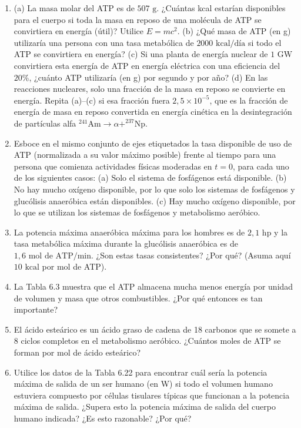 \documentclass[12pt]{book}
\begin{document}
\begin{enumerate}
\item[6.39] (a) La masa molar del ATP es de $507\text{ g}$. ¿Cuántas kcal estarían disponibles para el cuerpo si toda la masa en reposo de una molécula de ATP se convirtiera en energía (útil)? Utilice $E = mc^2$. (b) ¿Qué masa de ATP (en g) utilizaría una persona con una tasa metabólica de $2000\text{ kcal/día}$ si todo el ATP se convirtiera en energía? (c) Si una planta de energía nuclear de $1\text{ GW}$ convirtiera esta energía de ATP en energía eléctrica con una eficiencia del $20\%$, ¿cuánto ATP utilizaría (en g) por segundo y por año? (d) En las reacciones nucleares, solo una fracción de la masa en reposo se convierte en energía. Repita (a)--(c) si esa fracción fuera $2{,}5 \times 10^{-5}$, que es la fracción de energía de masa en reposo convertida en energía cinética en la desintegración de partículas alfa $^{241}\text{Am} \rightarrow \alpha + ^{237}\text{Np}$.

\item[6.40] Esboce en el mismo conjunto de ejes etiquetados la tasa disponible de uso de ATP (normalizada a su valor máximo posible) frente al tiempo para una persona que comienza actividades físicas moderadas en $t = 0$, para cada uno de los siguientes casos: (a) Solo el sistema de fosfágenos está disponible. (b) No hay mucho oxígeno disponible, por lo que solo los sistemas de fosfágenos y glucólisis anaeróbica están disponibles. (c) Hay mucho oxígeno disponible, por lo que se utilizan los sistemas de fosfágenos y metabolismo aeróbico.

\item[6.41] La potencia máxima anaeróbica máxima para los hombres es de $2{,}1\text{ hp}$ y la tasa metabólica máxima durante la glucólisis anaeróbica es de $1{,}6\text{ mol de ATP/min}$. ¿Son estas tasas consistentes? ¿Por qué? (Asuma aquí $10\text{ kcal}$ por mol de ATP).

\item[6.42] La Tabla 6.3 muestra que el ATP almacena mucha menos energía por unidad de volumen y masa que otros combustibles. ¿Por qué entonces es tan importante?

\item[6.43] El ácido esteárico es un ácido graso de cadena de 18 carbonos que se somete a 8 ciclos completos en el metabolismo aeróbico. ¿Cuántos moles de ATP se forman por mol de ácido esteárico?

\item[6.44] Utilice los datos de la Tabla 6.22 para encontrar cuál sería la potencia máxima de salida de un ser humano (en W) si todo el volumen humano estuviera compuesto por células tisulares típicas que funcionan a la potencia máxima de salida. ¿Supera esto la potencia máxima de salida del cuerpo humano indicada? ¿Es esto razonable? ¿Por qué?


\end{enumerate}
\end{document}
